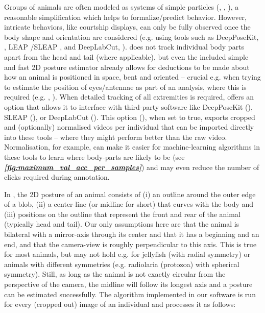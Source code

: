 \documentclass[9pt,lineno]{elife}
\newcommand{\figref}[1]{\textit{\textbf{\ref{#1}}}}
\newcommand{\TRex}{\protect\path{TRex}}
\begin{document}
Groups of animals are often modeled as systems of simple particles (\citealt{inada2002order}, \citealt{cavagna2010empirical}, \citealt{perez2011collective}), a reasonable simplification which helps to formalize/predict behavior. However, intricate behaviors, like courtship displays, can only be fully observed once the body shape and orientation are considered (e.g. using tools such as DeepPoseKit, \citealt{graving2019deepposekit}, LEAP \cite{pereira2019fast}/SLEAP \cite{Pereira2020.08.31.276246}, and DeepLabCut, \citealt{mathis2018deeplabcut}). \TRex{} does not track individual body parts apart from the head and tail (where applicable), but even the included simple and fast 2D posture estimator already allows for deductions to be made about how an animal is positioned in space, bent and oriented -- crucial e.g. when trying to estimate the position of eyes/antennae as part of an analysis, where this is required (e.g. \citealt{strandburg2013visual}, \citealt{rosenthal2015revealing}). {\color{blue} When detailed tracking of all extremities is required, \TRex{} offers an option that allows it to interface with third-party software like DeepPoseKit (\citealt{graving2019deepposekit}), SLEAP (\citealt{Pereira2020.08.31.276246}), or DeepLabCut (\citealt{mathis2018deeplabcut}). This option (\protect{}), when set to true, exports cropped and (optionally) normalised videos per individual that can be imported directly into these tools -- where they might perform better than the raw video. Normalisation, for example, can make it easier for machine-learning algorithms in these tools to learn where body-parts are likely to be (see \figref{fig:maximum_val_acc_per_samples}) and may even reduce the number of clicks required during annotation.}

In \TRex{}, the 2D posture of an animal consists of (i) an outline around the outer edge of a blob, (ii) a center-line (or midline for short) that curves with the body and (iii) positions on the outline that represent the front and rear of the animal (typically head and tail). Our only assumptions here are that the animal is bilateral with a mirror-axis through its center and that it has a beginning and an end, and that the camera-view is roughly perpendicular to this axis. This is true for most animals, but may not hold e.g. for jellyfish (with radial symmetry) or animals with different symmetries (e.g. radiolaria (protozoa) with spherical symmetry). Still, as long as the animal is not exactly circular from the perspective of the camera, the midline will follow its longest axis and a posture can be estimated successfully.  The algorithm implemented in our software is run for every (cropped out) image of an individual and processes it as follows:
\end{document}
